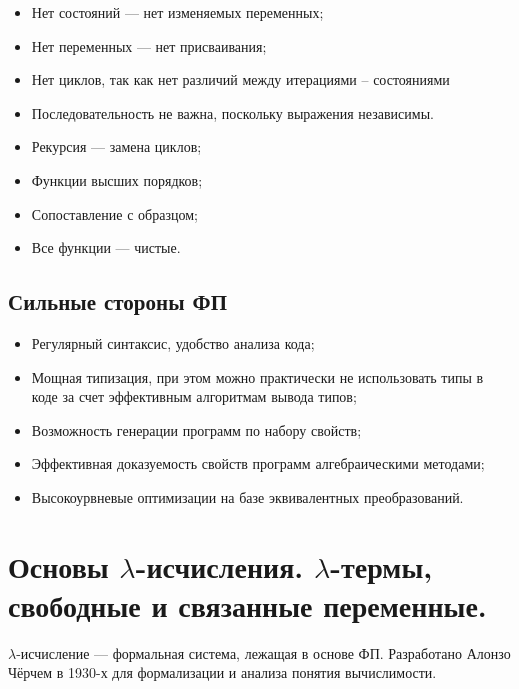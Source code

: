\documentclass[11pt,a4paper]{article}
\begin{document}
\begin{minipage}{0.47\linewidth}
\begin{itemize}
	\item Нет состояний --- нет изменяемых переменных;
	\item Нет переменных --- нет присваивания;
	\item Нет циклов, так как нет различий между итерациями -- состояниями
	\item Последовательность не важна, поскольку выражения независимы.
\end{itemize}
\end{minipage}
\hfill
\begin{minipage}{0.47\linewidth}
	\begin{itemize}
		\item Рекурсия --- замена циклов;
		\item Функции высших порядков;
		\item Сопоставление с образцом;
		\item Все функции --- чистые.
    \end{itemize}
\end{minipage}
\subsection{Сильные стороны ФП}
\begin{itemize}
	\item Регулярный синтаксис, удобство анализа кода;
	\item Мощная типизация, при этом можно практически не использовать типы в коде за счет эффективным алгоритмам вывода типов;
	\item Возможность генерации программ по набору свойств;
	\item Эффективная доказуемость свойств программ алгебраическими методами;
	\item Высокоурвневые оптимизации на базе эквивалентных преобразований.
\end{itemize}

\section{Основы $ \lambda$-исчисления. $ \lambda$-термы, свободные и связанные переменные.}
$ \lambda$-исчисление --- формальная система, лежащая в основе ФП. Разработано Алонзо Чёрчем в 1930-х для формализации и анализа понятия вычислимости.
\end{document}
